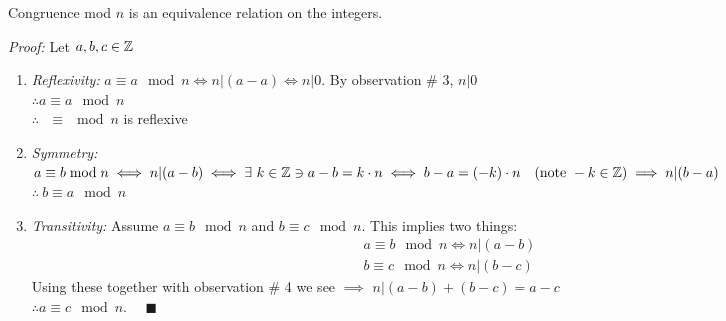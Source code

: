 \begin{lemma}[Part 1]
Congruence mod $n$ is an equivalence relation on the integers.\steezybreak

\noindent \textit{Proof:} Let $a,b,c\in {\mathbb{Z}}$
\begin{enumerate}
    \item \textit{Reflexivity:} $a\equiv a\mod n \iff n|(a-a) \iff n|0$. By observation \# 3,
    $n|0$\\
    $\therefore a\equiv a\mod n$\\
    $\therefore \ \ \ \equiv \mod n$ is reflexive\\
    \item \textit{Symmetry:} \\
    $a\equiv b\bmod n \iff n|(a-b) \iff \exists \ k \in {\mathbb{Z}} \ni a-b=k\cdot n \iff b-a=(-k)\cdot n \ \ \ (\text{note } -k\in {\mathbb{Z}}) \implies n|(b-a)$\\
    $\therefore \ b\equiv a \mod n$
    \item \textit{Transitivity:} Assume $a\equiv b \mod n$ and $b\equiv c\mod n$. This implies two
    things:
    \begin{align}
        a\equiv b\mod n \iff n|(a-b) \nonumber\\
        b\equiv c\mod n \iff n|(b-c) \nonumber
    \end{align}
    Using these together with observation \# 4 we see $\implies$ $n|(a-b)+(b-c)=a-c$\\
    $\therefore a\equiv c \mod n.\ \ \ \ \ \ \blacksquare$
\end{enumerate}
\end{lemma}

